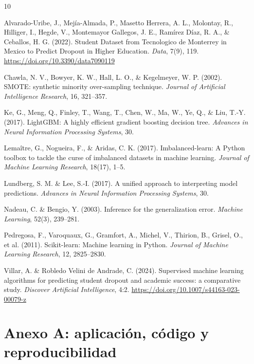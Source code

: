 \documentclass[11pt,a4paper]{article}
\begin{document}
\begin{thebibliography}{10}
\footnotesize
\setlength{\itemsep}{1pt}

Alvarado-Uribe, J., Mejía-Almada, P., Masetto Herrera, A. L., Molontay, R., Hilliger, I., Hegde, V., Montemayor Gallegos, J. E., Ramírez Díaz, R. A., \& Ceballos, H. G. (2022). Student Dataset from Tecnologico de Monterrey in Mexico to Predict Dropout in Higher Education. \textit{Data}, 7(9), 119. \url{https://doi.org/10.3390/data7090119}

Chawla, N. V., Bowyer, K. W., Hall, L. O., \& Kegelmeyer, W. P. (2002). SMOTE: synthetic minority over-sampling technique. \textit{Journal of Artificial Intelligence Research}, 16, 321--357.

Ke, G., Meng, Q., Finley, T., Wang, T., Chen, W., Ma, W., Ye, Q., \& Liu, T.-Y. (2017). LightGBM: A highly efficient gradient boosting decision tree. \textit{Advances in Neural Information Processing Systems}, 30.

Lemaître, G., Nogueira, F., \& Aridas, C. K. (2017). Imbalanced-learn: A Python toolbox to tackle the curse of imbalanced datasets in machine learning. \textit{Journal of Machine Learning Research}, 18(17), 1--5.

Lundberg, S. M. \& Lee, S.-I. (2017). A unified approach to interpreting model predictions. \textit{Advances in Neural Information Processing Systems}, 30.

Nadeau, C. \& Bengio, Y. (2003). Inference for the generalization error. \textit{Machine Learning}, 52(3), 239--281.

Pedregosa, F., Varoquaux, G., Gramfort, A., Michel, V., Thirion, B., Grisel, O., et al. (2011). Scikit-learn: Machine learning in Python. \textit{Journal of Machine Learning Research}, 12, 2825--2830.

Villar, A. \& Robledo Velini de Andrade, C. (2024). Supervised machine learning algorithms for predicting student dropout and academic success: a comparative study. \textit{Discover Artificial Intelligence}, 4:2. \url{https://doi.org/10.1007/s44163-023-00079-z}

\end{thebibliography}

\section*{Anexo A: aplicación, código y reproducibilidad}
\end{document}
